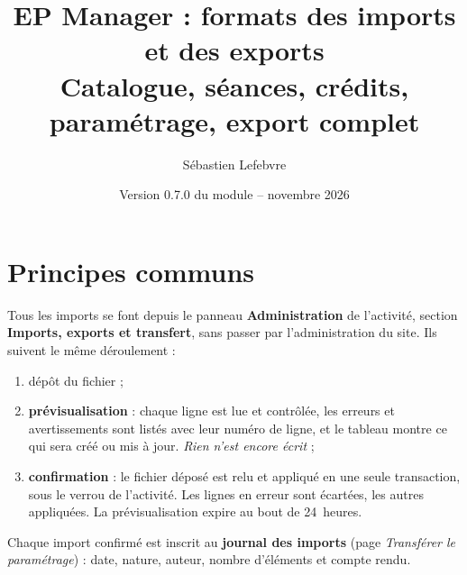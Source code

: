 \documentclass[11pt,a4paper]{article}
\title{EP Manager : formats des imports et des exports\\
  \large Catalogue, séances, crédits, paramétrage, export complet}
\author{Sébastien Lefebvre}
\date{Version 0.7.0 du module \code{mod_ep} -- novembre 2026}
\begin{document}
\maketitle
\tableofcontents

\section{Principes communs}

Tous les imports se font depuis le panneau \textbf{Administration} de l'activité, section
\textbf{Imports, exports et transfert}, sans passer par l'administration du site. Ils
suivent le même déroulement :
\begin{enumerate}
  \item dépôt du fichier ;
  \item \textbf{prévisualisation} : chaque ligne est lue et contrôlée, les erreurs et
    avertissements sont listés avec leur numéro de ligne, et le tableau montre ce qui sera
    créé ou mis à jour. \emph{Rien n'est encore écrit} ;
  \item \textbf{confirmation} : le fichier déposé est relu et appliqué en une seule
    transaction, sous le verrou de l'activité. Les lignes en erreur sont écartées, les
    autres appliquées. La prévisualisation expire au bout de 24~heures.
\end{enumerate}
Chaque import confirmé est inscrit au \textbf{journal des imports} (page \emph{Transférer le
paramétrage}) : date, nature, auteur, nombre d'éléments et compte rendu.
\end{document}
